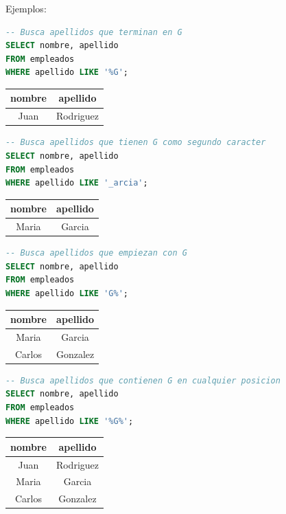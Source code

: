 \documentclass[12pt]{article}
\begin{document}
Ejemplos:
\begin{lstlisting}[language=SQL]
-- Busca apellidos que terminan en G
SELECT nombre, apellido
FROM empleados
WHERE apellido LIKE '%G';
\end{lstlisting}

\begin{center}
\begin{tabular}{cc}
\toprule
nombre & apellido \\
\midrule
Juan & Rodriguez \\
\bottomrule
\end{tabular}
\end{center}

\begin{lstlisting}[language=SQL]
-- Busca apellidos que tienen G como segundo caracter
SELECT nombre, apellido
FROM empleados
WHERE apellido LIKE '_arcia';
\end{lstlisting}

\begin{center}
\begin{tabular}{cc}
\toprule
nombre & apellido \\
\midrule
Maria & Garcia \\
\bottomrule
\end{tabular}
\end{center}

\begin{lstlisting}[language=SQL]
-- Busca apellidos que empiezan con G
SELECT nombre, apellido
FROM empleados
WHERE apellido LIKE 'G%';
\end{lstlisting}

\begin{center}
\begin{tabular}{cc}
\toprule
nombre & apellido \\
\midrule
Maria & Garcia \\
Carlos & Gonzalez \\
\bottomrule
\end{tabular}
\end{center}

\begin{lstlisting}[language=SQL]
-- Busca apellidos que contienen G en cualquier posicion
SELECT nombre, apellido
FROM empleados
WHERE apellido LIKE '%G%';
\end{lstlisting}

\begin{center}
\begin{tabular}{cc}
\toprule
nombre & apellido \\
\midrule
Juan & Rodriguez \\
Maria & Garcia \\
Carlos & Gonzalez \\
\bottomrule
\end{tabular}
\end{center}
\end{document}
